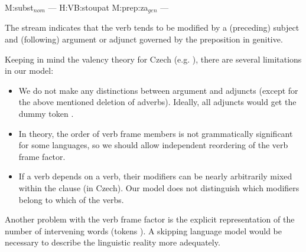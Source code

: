 \documentclass[10pt]{report}
\theoremstyle{plain}
\begin{document}
{{\begin{center}
M:subst$_{nom}$ --- H:VB:stoupat M:prep:za$_{gen}$ ---
\end{center}

The stream indicates that the verb  tends to be modified by a
(preceding) subject and (following) argument or adjunct governed by the
preposition  in genitive.

Keeping in mind the valency theory for Czech (e.g. ),
there are several limitations in our model:

\begin{itemize}

\item We do not make any distinctions between
argument and adjuncts (except for the above mentioned deletion of adverbs).
Ideally, all adjuncts would get the dummy token \text{---}.


\item In theory,
the order of verb frame members is not grammatically significant for some
languages, so we should allow independent reordering of the verb frame factor.


\item If a verb depends on a verb, their modifiers can be nearly arbitrarily mixed
  within the clause (in Czech). Our model does not distinguish which modifiers
  belong to which of the verbs.

\end{itemize}

Another problem with the verb frame factor is the explicit representation of
the number of intervening words (tokens \text{---}). A skipping language model
would be necessary to describe the linguistic reality more adequately.



}}
\end{document}
